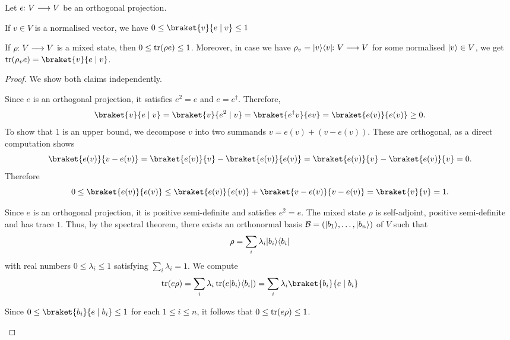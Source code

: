 \documentclass[a4paper, oneside, 12pt]{amsart}
\begin{document}
\begin{lemma}\label{lem:orthogonal-projections-and-probabilities}
  Let \(e \from V \to V\) be an orthogonal projection.
  \begin{thmlist}
    \item If \(v\in V\) is a normalised vector, we have \(0 \leq \braket{v}{e \mid v} \leq 1 \)
    \item If \(\rho\from V \to V\) is a mixed state, then \(0 \leq \operatorname{tr}(\rho e) \leq 1\).
    Moreover, in case we have \(\rho_{v} = \ket{v}\bra{v} \from V\to V\) for some normalised \(\lvert v\rangle \in V\), we get \(\tr(\rho_{v} e) = \braket{v}{e \mid v}\).
  \end{thmlist}
\end{lemma}
\begin{proof}
  We show both claims independently.
  \begin{thmlist}
    \item Since \( e \) is an orthogonal projection, it satisfies \( e^2 = e \) and \( e = e^\dagger \).
    Therefore,
    \begin{equation*}
      \braket{v}{e \mid v} = \braket{v}{e^2 \mid v} = \braket{e^\dagger v}{e v} = \braket{e(v)}{e(v)} \geq 0.
    \end{equation*}
    To show that \(1\) is an upper bound, we decompose \( v \) into two summands \( v = e(v) + (v - e(v)) \).
    These are orthogonal, as a direct computation shows
    \begin{equation*}
      \braket{e(v)}{v - e(v)}
      = \braket{e(v)}{v} - \braket{e(v)}{e(v)}
      = \braket{e(v)}{v} - \braket{e(v)}{v}
      = 0.
    \end{equation*}
    Therefore
    \begin{equation*}
      0
      \leq \braket{e(v)}{e(v)}
      \leq \braket{e(v)}{e(v)} + \braket{v - e(v)}{v - e(v)}
      = \braket{v}{v}
      = 1.
    \end{equation*}
  \item   Since \( e \) is an orthogonal projection, it is positive semi-definite and satisfies \( e^2 = e \).
  The mixed state \( \rho \) is self-adjoint, positive semi-definite and has trace \(1\).
  Thus, by the spectral theorem, there exists an orthonormal basis \(\mathcal{B}= (\lvert b_{1}\rangle, \dots , \lvert b_{n}\rangle)\) of \(V\) such that
  \begin{equation*}
    \rho = \sum_i \lambda_i \lvert b_{i}\rangle \langle b_{i}\rvert
  \end{equation*}
  with real numbers \( 0 \leq \lambda_i\leq 1\) satisfying \( \sum_i \lambda_i = 1 \).
  We compute
  \begin{equation*}
    \tr(e\rho)
    = \sum_i \lambda_i \tr(e \ket{b_i} \bra{b_i}) =
    \sum_i \lambda_i \braket{b_i}{e \mid b_i}
  \end{equation*}

  Since \( 0 \leq \braket{b_i}{e \mid b_i} \leq 1 \) for each \( 1\leq i \leq n \), it follows that \( 0 \leq \operatorname{tr}(e\rho) \leq 1 \).
  \end{thmlist}
\end{proof}
\end{document}
